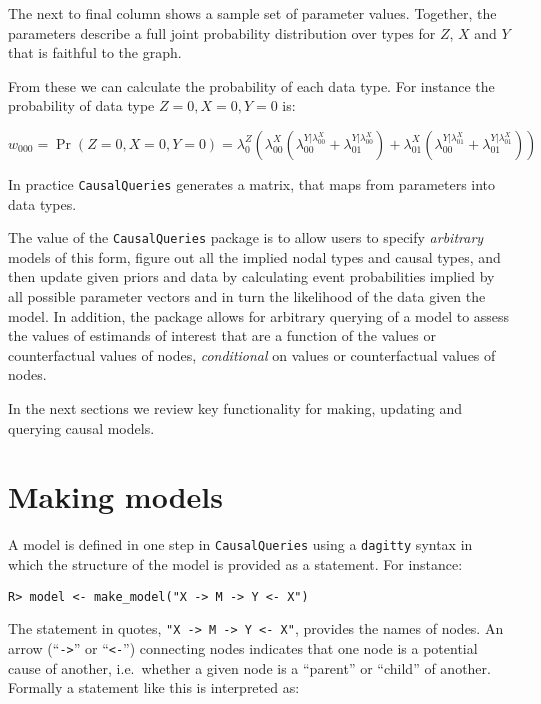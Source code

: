 \documentclass[
  11pt,
  article]{jss}
\begin{document}
The next to final column shows a sample set of parameter values.
Together, the parameters describe a full joint probability distribution
over types for \(Z\), \(X\) and \(Y\) that is faithful to the graph.

From these we can calculate the probability of each data type. For
instance the probability of data type \(Z=0, X=0, Y=0\) is:

\[w_{000}=\Pr(Z=0, X=0, Y=0) = \lambda^Z_0\left(\lambda^X_{00}(\lambda^{Y|\lambda^X_{00}}_{00}+\lambda^{Y|\lambda^X_{00}}_{01}) + \lambda^X_{01}(\lambda^{Y|\lambda^X_{01}}_{00}+\lambda^{Y|\lambda^X_{01}}_{01})\right)\]

In practice \texttt{CausalQueries} generates a matrix, that maps from
parameters into data types.

The value of the \texttt{CausalQueries} package is to allow users to
specify \emph{arbitrary} models of this form, figure out all the implied
nodal types and causal types, and then update given priors and data by
calculating event probabilities implied by all possible parameter
vectors and in turn the likelihood of the data given the model. In
addition, the package allows for arbitrary querying of a model to assess
the values of estimands of interest that are a function of the values or
counterfactual values of nodes, \emph{conditional} on values or
counterfactual values of nodes.

In the next sections we review key functionality for making, updating
and querying causal models.

\hypertarget{sec-make}{%
\section{Making models}\label{sec-make}}

A model is defined in one step in \texttt{CausalQueries} using a
\texttt{dagitty} syntax \citep{textor_robust_2016} in which the
structure of the model is provided as a statement. For instance:

\begin{verbatim}
R> model <- make_model("X -> M -> Y <- X")
\end{verbatim}

The statement in quotes,
\texttt{"X\ -\textgreater{}\ M\ -\textgreater{}\ Y\ \textless{}-\ X"},
provides the names of nodes. An arrow (``\texttt{-\textgreater{}}'' or
``\texttt{\textless{}-}'') connecting nodes indicates that one node is a
potential cause of another, i.e.~whether a given node is a ``parent'' or
``child'' of another. Formally a statement like this is interpreted as:
\end{document}
